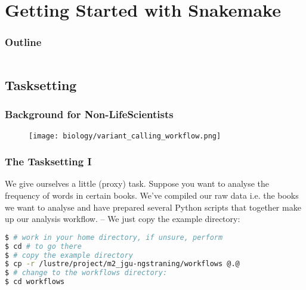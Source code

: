 \section{Getting Started with Snakemake}

\begin{frame}
    \frametitle{Outline}
    \begin{columns}[t]
        \begin{column}{.5\textwidth}
            \tableofcontents[sections={1-9},currentsection]
        \end{column}
        \begin{column}{.5\textwidth}
            \tableofcontents[sections={10-18},currentsection]
        \end{column}
    \end{columns}
\end{frame}

\subsection{Tasksetting}

\begin{frame}
  \frametitle{Background for Non-LifeScientists}
  \begin{figure}
    \centering
    \texttt{[image: biology/variant\_calling\_workflow.png]}
  \end{figure}
\end{frame}


\begin{frame}[fragile]
  \frametitle{The Tasksetting I}
  We give ourselves a little (proxy) task. Suppose you want to analyse the frequency of words in certain books.\newline
  \pause
  We’ve compiled our raw data i.e. the books we want to analyse and have prepared several Python scripts that together make up our analysis workflow. -- We just copy the example directory:
  \begin{lstlisting}[language=Bash, style=Shell]
$ # work in your home directory, if unsure, perform
$ cd # to go there
$ # copy the example directory
$ cp -r /lustre/project/m2_jgu-ngstraning/workflows @.@
$ # change to the workflows directory:
$ cd workflows
  \end{lstlisting}
\end{frame}

